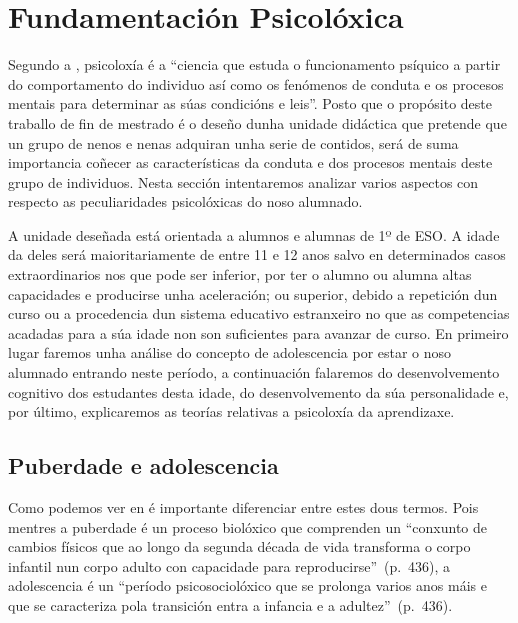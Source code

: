 

\section{Fundamentación Psicolóxica}

Segundo a , psicoloxía é a ``ciencia que estuda o funcionamento psíquico a partir do comportamento do individuo así como os fenómenos de conduta e os procesos mentais para determinar as súas condicións e leis''. Posto que o propósito deste traballo de fin de mestrado é o deseño dunha unidade didáctica que pretende que un grupo de nenos e nenas adquiran unha serie de contidos, será de suma importancia coñecer as características da conduta e dos procesos mentais deste grupo de individuos. Nesta sección intentaremos analizar varios aspectos con respecto as peculiaridades psicolóxicas do noso alumnado.

A unidade deseñada está orientada a alumnos e alumnas de 1º de ESO. A idade da deles será maioritariamente de entre 11 e 12 anos salvo en determinados casos extraordinarios nos que pode ser inferior, por ter o alumno ou alumna altas capacidades e producirse unha aceleración; ou superior, debido a repetición dun curso ou a procedencia dun sistema educativo estranxeiro no que as competencias acadadas para a súa idade non son suficientes para avanzar de curso. En primeiro lugar faremos unha análise do concepto de adolescencia por estar o noso alumnado entrando neste período, a continuación falaremos do desenvolvemento cognitivo dos estudantes desta idade, do desenvolvemento da súa personalidade e, por último, explicaremos as teorías relativas a psicoloxía da aprendizaxe.

\subsection{Puberdade e adolescencia}
Como podemos ver en  é importante diferenciar entre estes dous termos. Pois mentres a puberdade é un proceso biolóxico que comprenden un ``conxunto de cambios físicos que ao longo da segunda década de vida transforma o corpo infantil nun corpo adulto con capacidade para reproducirse''~(p.~436), a adolescencia é un ``período psicosociolóxico que se prolonga varios anos máis e que se caracteriza pola transición entra a infancia e a adultez''~(p.~436).

